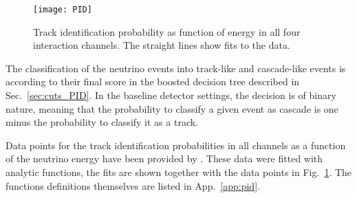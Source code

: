 \begin{figure}[htbp]
 \centering
 \texttt{[image: PID]}
 \caption{Track identification probability as function of energy in all four
  interaction channels. The straight lines show fits to the data.}
 \label{fig:PID}
\end{figure}

The classification of the neutrino events into track-like and cascade-like
events is according to their final score in the boosted decision tree described
in Sec.~\ref{sec:cuts_PID}. In the baseline detector settings, the decision is
of binary nature, meaning that the probability to classify a given event as
cascade is one minus the probability to classify it as a track.

Data points for the track identification probabilities in all channels as a
function of the neutrino energy have been provided by \cite{JP_PID}. These data
were fitted with analytic functions, the fits are shown together with the data
points in Fig.~\ref{fig:PID}. The functions definitions themselves are listed
in App.~\ref{app:pid}.